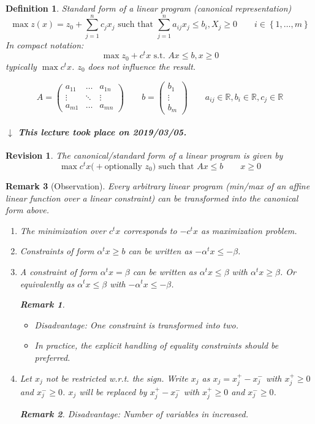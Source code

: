 \documentclass{article}
\numberwithin{lecref}{section}
\newtheorem*{Definition}{Definition}
\newtheorem*{Remark}{Remark}
\newtheorem*{Revision}{Revision}
\newcommand{\Set}[1]{\left\{#1\right\}}
\newcommand{\dateref}[1]{%
  \begin{mdframed}[backgroundcolor=gray!10,innerbottommargin=0pt,innertopmargin=0pt]
    \paragraph{\textit{$\downarrow$ This lecture took place on #1.}}%
  \end{mdframed}%
}
\begin{document}
\begin{Definition}
  Standard form of a linear program (canonical representation)
  \[ \max{z(x)} = z_0 + \sum_{j=1}^n c_j x_j \text{ such that } \sum_{j=1}^n a_{ij} x_j \leq b_i, X_j \geq 0 \qquad i \in \Set{1, \dots, m} \]
  In compact notation:
  \[ \max{z_0 + c^t x} \text{ s.t. } Ax \leq b, x \geq 0 \]
  typically $\max c^t x$.
  $z_0$ does not influence the result.

  \[ A = \begin{pmatrix} a_{11} & \dots & a_{1n} \\ \vdots & \ddots & \vdots \\ a_{m1} & \dots & a_{mn} \end{pmatrix} \qquad b = \begin{pmatrix} b_1 \\ \vdots \\ b_m \end{pmatrix} \qquad a_{ij} \in \mathbb R, b_i \in \mathbb R, c_j \in \mathbb R \]
\end{Definition}

\dateref{2019/03/05}

\begin{Revision}
	The canonical/standard form of a linear program is given by
	\[ \max c^t x \text{(} + \text{optionally } z_0 \text{) such that } Ax \leq b \qquad x \geq 0 \]
\end{Revision}

\begin{Remark}[Observation]
  Every arbitrary linear program (min/max of an affine linear function over a linear constraint) can be transformed into the canonical form above.
  \begin{enumerate}
  	\item The minimization over $c^t x$ corresponds to $-c^t x$ as maximization problem.
  	\item Constraints of form $\alpha^t x \geq b$ can be written as $-\alpha^t x \leq -\beta$.
  	\item A constraint of form $\alpha^t x = \beta$ can be written as $\alpha^t x \leq \beta$ with $\alpha^t x \geq \beta$. Or equivalently as $\alpha^t x \leq \beta$ with $-\alpha^t x \leq -\beta$.
  		\begin{Remark} \hfill
	  		\begin{itemize}
	  			\item Disadvantage: One constraint is transformed into two.
	  			\item In practice, the explicit handling of equality constraints should be preferred.
	  		\end{itemize}
  		\end{Remark}
  	\item Let $x_j$ not be restricted w.r.t. the sign. Write $x_j$ as $x_j = x_j^+ - x_j^-$ with $x_j^+ \geq 0$ and $x_j^- \geq 0$.
  		$x_j$ will be replaced by $x_j^+ - x_j^-$ with $x_j^+ \geq 0$ and $x_j^- \geq 0$.
  		\begin{Remark}
  			Disadvantage: Number of variables in increased.
  		\end{Remark}
  \end{enumerate}
\end{Remark}
\end{document}
